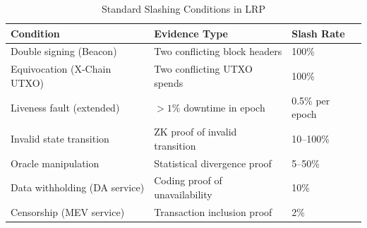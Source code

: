 \begin{table}[H]
\centering
\caption{Standard Slashing Conditions in LRP}
\label{tab:slash_conditions}
\begin{tabular}{lll}
\toprule
\textbf{Condition} & \textbf{Evidence Type} & \textbf{Slash Rate} \\
\midrule
Double signing (Beacon) & Two conflicting block headers & 100\% \\
Equivocation (X-Chain UTXO) & Two conflicting UTXO spends & 100\% \\
Liveness fault (extended) & $> 1\%$ downtime in epoch & 0.5\% per epoch \\
Invalid state transition & ZK proof of invalid transition & 10--100\% \\
Oracle manipulation & Statistical divergence proof & 5--50\% \\
Data withholding (DA service) & Coding proof of unavailability & 10\% \\
Censorship (MEV service) & Transaction inclusion proof & 2\% \\
\bottomrule
\end{tabular}
\end{table}

